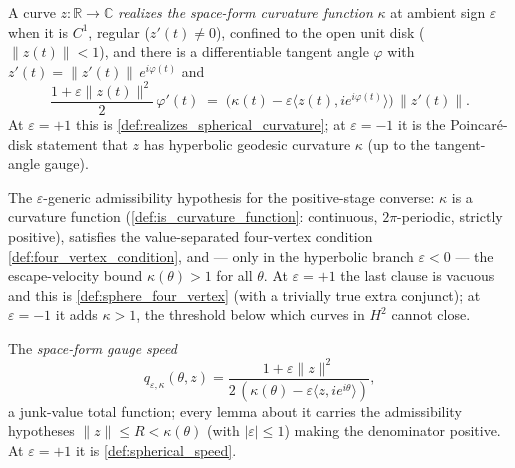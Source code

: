 \begin{definition}
  \label{def:spaceform_realizes}
  A curve $z:\mathbb R\to\mathbb C$ \emph{realizes the space-form curvature
  function} $\kappa$ at ambient sign $\varepsilon$ when it is $C^1$, regular
  ($z'(t)\ne0$), confined to the open unit disk ($\|z(t)\|<1$), and there is a
  differentiable tangent angle $\varphi$ with
  $z'(t)=\|z'(t)\|\,e^{i\varphi(t)}$ and
  \[
    \frac{1+\varepsilon\|z(t)\|^2}{2}\,\varphi'(t)
    \;=\;\bigl(\kappa(t)-\varepsilon\langle z(t),
      ie^{i\varphi(t)}\rangle\bigr)\,\|z'(t)\|.
  \]
  At $\varepsilon=+1$ this is \cref{def:realizes_spherical_curvature}; at
  $\varepsilon=-1$ it is the Poincar\'e-disk statement that $z$ has
  hyperbolic geodesic curvature $\kappa$ (up to the tangent-angle gauge).
\end{definition}

\begin{definition}
  \label{def:spaceform_four_vertex}
  The $\varepsilon$-generic admissibility hypothesis for the positive-stage
  converse: $\kappa$ is a curvature function
  (\cref{def:is_curvature_function}: continuous, $2\pi$-periodic, strictly
  positive), satisfies the value-separated four-vertex condition
  \cref{def:four_vertex_condition}, and — only in the hyperbolic branch
  $\varepsilon<0$ — the escape-velocity bound $\kappa(\theta)>1$ for all
  $\theta$. At $\varepsilon=+1$ the last clause is vacuous and this is
  \cref{def:sphere_four_vertex} (with a trivially true extra conjunct); at
  $\varepsilon=-1$ it adds $\kappa>1$, the threshold below which curves in
  $H^2$ cannot close.
\end{definition}

\begin{definition}
  \label{def:spaceform_speed}
  The \emph{space-form gauge speed}
  \[
    q_{\varepsilon,\kappa}(\theta,z)=
    \frac{1+\varepsilon\|z\|^2}
         {2\,(\kappa(\theta)-\varepsilon\langle z, ie^{i\theta}\rangle)},
  \]
  a junk-value total function; every lemma about it carries the admissibility
  hypotheses $\|z\|\le R<\kappa(\theta)$ (with $|\varepsilon|\le1$) making the
  denominator positive. At $\varepsilon=+1$ it is \cref{def:spherical_speed}.
\end{definition}

